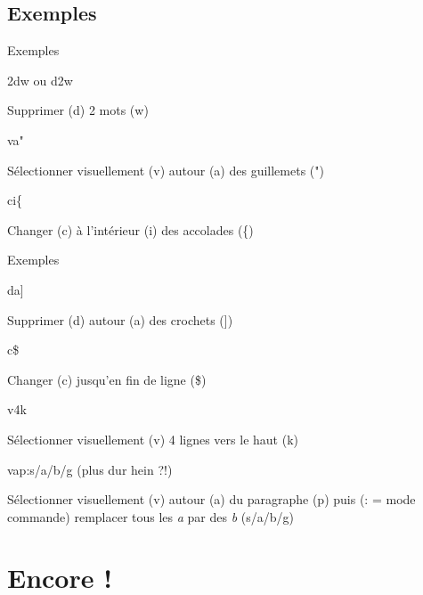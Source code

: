 \documentclass{beamer}
\begin{document}
\subsection{Exemples}
\frame{\tableofcontents[currentsubsection]}

\begin{frame}{Exemples}
\begin{center}
\alert{2dw ou d2w}

\pause{}
Supprimer (\alert{d}) \alert{2} mots (\alert{w})

\pause{}

\alert{va"}

\pause{}
Sélectionner visuellement (\alert{v}) autour (\alert{a}) des guillemets (\alert{"})

\pause{}

\alert{ci\{}

\pause{}
Changer (\alert{c}) à l'intérieur (\alert{i}) des accolades (\alert{\{})

\end{center}
\end{frame}

\begin{frame}{Exemples}
\begin{center}

\alert{da]}

\pause{}
Supprimer (\alert{d}) autour (\alert{a}) des crochets (\alert{]})

\pause{}

\alert{c\$}

\pause{}
Changer (\alert{c}) jusqu'en fin de ligne (\alert{\$})

\pause{}

\alert{v4k}

\pause{}
Sélectionner visuellement (\alert{v}) \alert{4} lignes vers le haut (\alert{k})

\pause{}

\alert{vap:s/a/b/g (plus dur hein ?!)}

\pause{}
Sélectionner visuellement (\alert{v}) autour (\alert{a}) du paragraphe (\alert{p}) puis (\alert{:} = mode commande) remplacer tous les {\it a} par des {\it b} (\alert{s/a/b/g})
\end{center}
\end{frame}

\section{Encore !}
\subsection{}
\frame{\tableofcontents[currentsection]}
\end{document}
